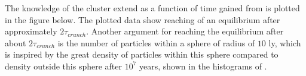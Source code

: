 The knowledge of the cluster extend as a function of time gained from  is plotted in the figure below. 
The plotted data show reaching of an equilibrium after approximately $2\tau_{crunch}$.
Another argument for reaching the equilibrium after about $2\tau_{crunch}$ is the number of particles within a sphere of radius of $10$ ly, which is inspired by the great density of particles within this sphere compared to density outside this sphere after $10^7$ years, shown in the histograms of . 

